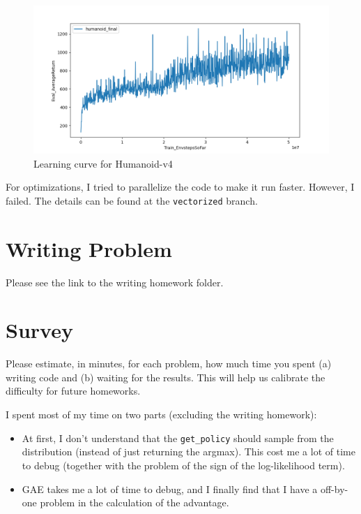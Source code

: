 \documentclass{article}
\begin{document}
\MYSOLUTION

\begin{figure}[H]
        \centering
        \includegraphics[width=0.9\linewidth]{./report/assets/E5.png} %
        \caption{Learning curve for Humanoid-v4}
        \label{fig:humanoid}
\end{figure}

For optimizations, I tried to parallelize the code to make it run faster. However, I failed. The details can be found at the \verb|vectorized| branch.

\section{Writing Problem}

\MYSOLUTION

Please see the link to the writing homework folder.


\setcounter{section}{8}
\newpage\section{Survey}
\label{sec:survey}
Please estimate, in minutes, for each problem, how much time you spent (a) writing code and (b) waiting for the results. This will help us calibrate the difficulty for future homeworks. 

\MYSOLUTION

I spent most of my time on two parts (excluding the writing homework):

\begin{itemize}
        \item At first, I don't understand that the \verb|get_policy| should sample from the distribution (instead of just returning the argmax). This cost me a lot of time to debug (together with the problem of the sign of the log-likelihood term).
        \item GAE takes me a lot of time to debug, and I finally find that I have a off-by-one problem in the calculation of the advantage.
\end{itemize}
\end{document}
